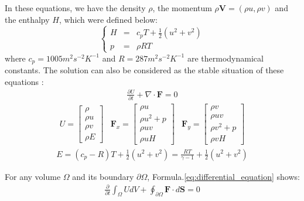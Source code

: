 \documentclass[%
 reprint,
 amsmath,amssymb,
pra,
]{revtex4-1}
\begin{document}
\begin{itemize}
In these equations, we have the density $\rho$, the momentum $\rho\bm{V}=\left(\rho u, \rho v\right)$ and the enthalpy $H$, which were defined below:
\begin{equation}
\left\{
\begin{array}{ccc}
	H & = & c_p T + \frac{1}{2}\left(u^2 + v^2\right)\\
	p & = & \rho R T
\end{array}
\right.
\end{equation}
where $c_p = 1005 m^2 s^{-2} K^{-1}$ and $R = 287 m^2 s^{-2} K^{-1}$ are thermodynamical constants. The solution can also be considered as the stable situation of these equations \cite{hirsch2007numerical}:
\begin{align}\label{eq:differential_equation}
	\frac{\partial U}{\partial t} + \nabla \cdot \bm{F} = 0
\end{align}
\begin{equation}
\begin{array}{ccc}
U = \left[
\begin{array}{c}
\rho\\
\rho u\\
\rho v\\
\rho E
\end{array}
\right]
&
\bm{F}_x = \left[
\begin{array}{c}
\rho u\\
\rho u^2 + p\\
\rho u v\\
\rho u H
\end{array}
\right]
&
\bm{F}_y = \left[
\begin{array}{c}
\rho v\\
\rho u v\\
\rho v^2 + p\\
\rho v H
\end{array}
\right]
\end{array}
\end{equation}
\begin{align}
	E = \left(c_p - R\right) T + \frac{1}{2}\left(u^2 + v^2\right) = \frac{R T}{\gamma - 1} + \frac{1}{2}\left(u^2 + v^2\right)
\end{align}

For any volume $\Omega$ and its boundary $\partial\Omega$, Formula.\ref{eq:differential_equation} shows:
\begin{align}\label{eq:integral_equation}
	\frac{\partial}{\partial t}\int_\Omega U d V + \oint_{\partial \Omega} \bm{F} \cdot d \bm{S} = 0
\end{align}


\end{itemize}
\end{document}
